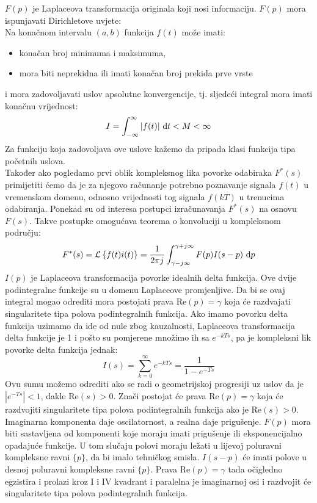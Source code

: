 \documentclass{article}
\newcommand{\suma}{\sum\limits}
\newcommand{\lap}[1]{\mathcal L \left\{ #1 \right\} }
\newenvironment{answer}{\begin{addmargin}[5pt]{0pt}}{\end{addmargin}}
\begin{document}
\begin{enumerate}
		\begin{answer}
			$F(p)$ je Laplaceova transformacija originala koji nosi informaciju. $F(p)$ mora ispunjavati Dirichletove uvjete:\\[5pt]
			Na konačnom intervalu $(a,b)$ funkcija $f(t)$ može imati:
			\begin{itemize}
				\item konačan broj minimuma i maksimuma,
				\item mora biti neprekidna ili imati konačan broj prekida prve vrste
			\end{itemize}
			i mora zadovoljavati uslov apsolutne konvergencije, tj. sljedeći integral mora imati konačnu vrijednost:
				$$I=\int_{-\infty}^\infty |f(t)|\ \text dt < M < \infty$$
			Za funkciju koja zadovoljava ove uslove kažemo da pripada klasi funkcija tipa početnih uslova. \\[5pt]
			Također ako pogledamo prvi oblik kompleksnog lika povorke odabiraka $F^*(s)$ primijetiti ćemo da je za njegovo računanje potrebno poznavanje signala $f(t)$ u vremenskom domenu, odnosno vrijednosti tog signala $f(kT)$ u trenucima odabiranja. Ponekad su od interesa postupci izračunavanja $F^*(s)$ na osnovu $F(s)$. Takve postupke omogućava teorema o konvoluciji u kompleksnom području:
				$$F^*(s) = \lap{f(t)i(t)} = \frac{1}{2\pi j} \int_{\gamma-j\infty}^{\gamma+j\infty} F(p) I(s-p)\ \text dp$$
			$I(p)$ je Laplaceova transformacija povorke idealnih delta funkcija. Ove dvije podintegralne funkcije su u domenu Laplaceove promjenljive. Da bi se ovaj integral mogao odrediti mora postojati prava Re$(p)=\gamma$ koja će razdvajati singularitete tipa polova podintegralnih funkcija. Ako imamo povorku delta funkcija uzimamo da ide od nule zbog kauzalnosti, Laplaceova transformacija delta funkcije je 1 i pošto su pomjerene množimo ih sa $e^{-kTs}$, pa je kompleksni lik povorke delta funkcija jednak:
				$$I(s) = \suma_{k=0}^\infty e^{-kTs} = \frac{1}{1-e^{-Ts}}$$
			Ovu sumu možemo odrediti ako se radi o geometrijskoj progresiji uz uslov da je $\left| e^{-Ts} \right| < 1$, dakle Re$(s)>0$. Znači postojat će prava Re$(p) = \gamma$ koja će razdvojiti singularitete tipa polova podintegralnih funkcija ako je Re$(s)>0$. Imaginarna komponenta daje oscilatornost, a realna daje prigušenje. $F(p)$ mora biti sastavljena od komponenti koje moraju imati prigušenje ili eksponencijalno opadajuće funkcije. U tom slučaju polovi moraju ležati u lijevoj poluravni kompleksne ravni $\{p\}$, da bi imalo tehničkog smisla. $I(s-p)$ će imati polove u desnoj poluravni kompleksne ravni $\{p\}$. Prava Re$(p)=\gamma$ tada očigledno egzistira i prolazi kroz I i IV kvadrant i paralelna je imaginarnoj osi i razdvojit će singularitete tipa polova podintegralnih funkcija.
		\end{answer}
		

\end{enumerate}
\end{document}
